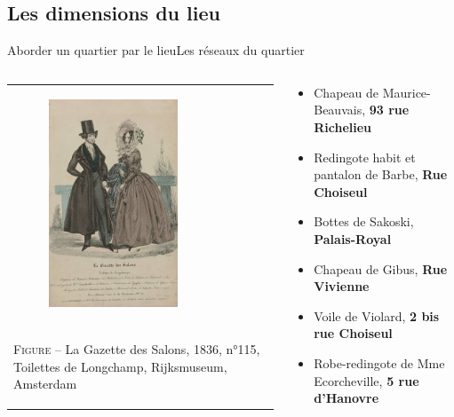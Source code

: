 \documentclass[8pt]{beamer}
\newcommand{\emulatecaption}[1]{%
	\begin{spacing}{0.9}%
		\scriptsize F\textsc{igure} -- #1%
	\end{spacing}
}
\begin{document}
\subsection{Les dimensions du lieu}
\begin{frame}{Aborder un quartier par le lieu}{Les réseaux du quartier}
	\begin{columns}[c]
		\begin{column}{0.5\textwidth}
			\begin{tabular}{p{\textwidth}}
				\begin{figure}
				\centering
					\includegraphics[width=0.7\textwidth]{includes/costume.png}
				\end{figure}
				\\ 
				\emulatecaption{La Gazette des Salons, 1836, n°115, Toilettes de Longchamp, Rijksmuseum, Amsterdam}
			\end{tabular}
		\end{column}
		\begin{column}{0.5\textwidth}
			\begin{itemize}
				\item Chapeau de Maurice-Beauvais, \textbf{93 rue Richelieu}
				\item Redingote habit et pantalon de Barbe, \textbf{Rue Choiseul}
				\item Bottes de Sakoski, \textbf{Palais-Royal}
				\item Chapeau de Gibus, \textbf{Rue Vivienne}
				\item Voile de Violard, \textbf{2 bis rue Choiseul}
				\item Robe-redingote de Mme Ecorcheville, \textbf{5 rue d’Hanovre}
			\end{itemize}		
		\end{column}
	\end{columns}
\end{frame}
\end{document}
